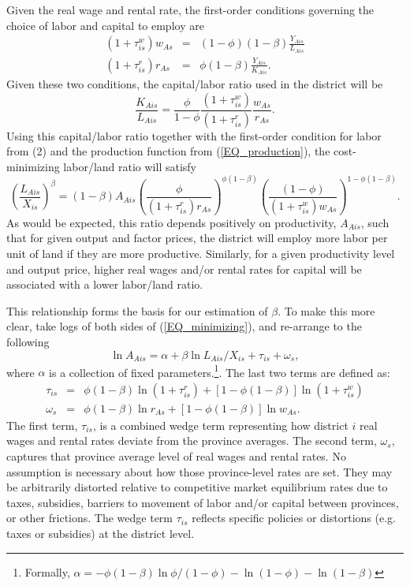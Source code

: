 Given the real wage and rental rate, the first-order conditions governing the choice of labor and capital to employ are
\begin{eqnarray}
    (1+\tau^w_{is})w_{As} &=& (1-\phi)(1-\beta) \frac{Y_{Ais}}{L_{Ais}} \\ \nonumber 
    (1+\tau^r_{is})r_{As} &=& \phi(1-\beta)\frac{Y_{Ais}}{K_{Ais}}. \label{EQ_factorprices}
\end{eqnarray}
Given these two conditions, the capital/labor ratio used in the district will be
\begin{equation}
	\frac{K_{Ais}}{L_{Ais}} = \frac{\phi}{1-\phi} \frac{(1+\tau^w_{is})}{(1+\tau^r_{is})} \frac{w_{As}}{r_{As}}. \nonumber
\end{equation}
Using this capital/labor ratio together with the first-order condition for labor from (2) and the production function from (\ref{EQ_production}), the cost-minimizing labor/land ratio will satisfy 
\begin{equation}
	\left(\frac{L_{Ais}}{X_{is}}\right)^{\beta} = (1-\beta) A_{Ais} \left(\frac{\phi}{(1+\tau^r_{is})r_{As}}\right)^{\phi(1-\beta)}\left(\frac{(1-\phi)}{(1+\tau^w_{is})w_{As}}\right)^{1 - \phi(1-\beta)}. \label{EQ_minimizing}
\end{equation}
As would be expected, this ratio depends positively on productivity, $A_{Ais}$, such that for given output and factor prices, the district will employ more labor per unit of land if they are more productive. Similarly, for a given productivity level and output price, higher real wages and/or rental rates for capital will be associated with a lower labor/land ratio.

This relationship forms the basis for our estimation of $\beta$. To make this more clear, take logs of both sides of (\ref{EQ_minimizing}), and re-arrange to the following
\begin{equation}
	\ln A_{Ais} = \alpha + \beta \ln L_{Ais}/X_{is} + \tau_{is} + \omega_s, \label{EQ_est}
\end{equation}
where $\alpha$ is a collection of fixed parameters.\footnote{Formally, $\alpha = -\phi(1-\beta)\ln \phi/(1-\phi) - \ln (1-\phi) - \ln (1-\beta)$}. The last two terms are defined as:
\begin{eqnarray}
	\tau_{is} &=& \phi(1-\beta) \ln (1+\tau^r_{is}) + [1-\phi(1-\beta)] \ln (1+\tau^w_{is}) \\
	\omega_s &=& \phi(1-\beta) \ln r_{As} + [1-\phi(1-\beta)] \ln w_{As}.
\end{eqnarray}
The first term, $\tau_{is}$, is a combined wedge term representing how district $i$ real wages and rental rates deviate from the province averages. The second term, $\omega_s$, captures that province average level of real wages and rental rates. No assumption is necessary about how those province-level rates are set. They may be arbitrarily distorted relative to competitive market equilibrium rates due to taxes, subsidies, barriers to movement of labor and/or capital between provinces, or other frictions. The wedge term $\tau_{is}$ reflects specific policies or distortions (e.g. taxes or subsidies) at the district level. 

